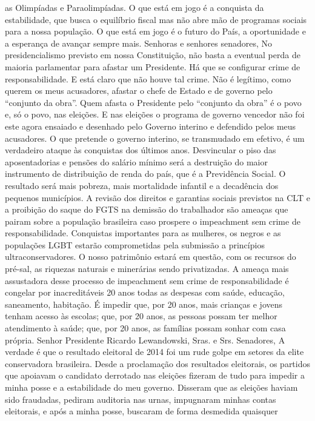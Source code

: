 as Olimpíadas e Paraolimpíadas. O que está em jogo é a conquista da
estabilidade, que busca o equilíbrio fiscal mas não abre mão de
programas sociais para a nossa população. O que está em jogo é o futuro
do País, a oportunidade e a esperança de avançar sempre mais. Senhoras e
senhores senadores, No presidencialismo previsto em nossa Constituição,
não basta a eventual perda de maioria parlamentar para afastar um
Presidente. Há que se configurar crime de responsabilidade. E está claro
que não houve tal crime. Não é legítimo, como querem os meus acusadores,
afastar o chefe de Estado e de governo pelo ``conjunto da obra''. Quem
afasta o Presidente pelo ``conjunto da obra'' é o povo e, só o povo, nas
eleições. E nas eleições o programa de governo vencedor não foi este
agora ensaiado e desenhado pelo Governo interino e defendido pelos meus
acusadores. O que pretende o governo interino, se transmudado em
efetivo, é um verdadeiro ataque às conquistas dos últimos anos.
Desvincular o piso das aposentadorias e pensões do salário mínimo será a
destruição do maior instrumento de distribuição de renda do país, que é
a Previdência Social. O resultado será mais pobreza, mais mortalidade
infantil e a decadência dos pequenos municípios. A revisão dos direitos
e garantias sociais previstos na CLT e a proibição do saque do FGTS na
demissão do trabalhador são ameaças que pairam sobre a população
brasileira caso prospere o impeachment sem crime de responsabilidade.
Conquistas importantes para as mulheres, os negros e as populações LGBT
estarão comprometidas pela submissão a princípios ultraconservadores. O
nosso patrimônio estará em questão, com os recursos do pré-sal, as
riquezas naturais e minerárias sendo privatizadas. A ameaça mais
assustadora desse processo de impeachment sem crime de responsabilidade
é congelar por inacreditáveis 20 anos todas as despesas com saúde,
educação, saneamento, habitação. É impedir que, por 20 anos, mais
crianças e jovens tenham acesso às escolas; que, por 20 anos, as pessoas
possam ter melhor atendimento à saúde; que, por 20 anos, as famílias
possam sonhar com casa própria. Senhor Presidente Ricardo Lewandowski,
Sras. e Srs. Senadores, A verdade é que o resultado eleitoral de 2014
foi um rude golpe em setores da elite conservadora brasileira. Desde a
proclamação dos resultados eleitorais, os partidos que apoiavam o
candidato derrotado nas eleições fizeram de tudo para impedir a minha
posse e a estabilidade do meu governo. Disseram que as eleições haviam
sido fraudadas, pediram auditoria nas urnas, impugnaram minhas contas
eleitorais, e após a minha posse, buscaram de forma desmedida quaisquer
